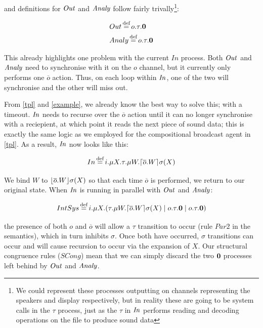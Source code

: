 \noindent and definitions for $\mathit{Out}$ and $\mathit{Analy}$ follow fairly
trivally\footnote{We could represent these processes outputting on
  channels representing the speakers and display respectively, but in
  reality these are going to be system calls in the $\tau$ process,
  just as the $\tau$ in $\mathit{In}$ performs reading and decoding operations
  on the file to produce sound data}:

\begin{equation}
\begin{aligned}
  & Out \operatorname{\stackrel{\textrm{def}}{=}} o.\tau.\textbf{0} \\
  & Analy \operatorname{\stackrel{\textrm{def}}{=}} o.\tau.\textbf{0}
\end{aligned}
\end{equation}

This already highlights one problem with the current $In$ process.
Both $\mathit{Out}$ and $\mathit{Analy}$ need to synchronise with it on the $o$ channel,
but it currently only performs one $\overline{o}$ action.  Thus, on
each loop within $\mathit{In}$, one of the two will synchronise and the other
will miss out.

From \ref{tpl} and \ref{example}, we already know the best way to
solve this; with a timeout.  $\mathit{In}$ needs to recurse over the
$\overline{o}$ action until it can no longer synchronise with a
reciepient, at which point it reads the next piece of sound data; this
is exactly the same logic as we employed for the compositional
broadcast agent in \ref{tpl}.  As a result, $\mathit{In}$ now looks like this:

\begin{equation}
  In \operatorname{\stackrel{\textrm{def}}{=}} i.\mu X.\tau.\mu W.\lceil{\overline{o}.W}\rceil {\sigma} ({X})
\end{equation}

\noindent We bind $W$ to $\lfloor{\overline{o}.W}\rfloor {\sigma} ({X})$ so that
each time $\overline{o}$ is performed, we return to our original state.
When $\mathit{In}$ is running in parallel with $\mathit{Out}$ and $\mathit{Analy}$:

\begin{equation}
  IntSys \operatorname{\stackrel{\textrm{def}}{=}} i.\mu X.(\tau.\mu W.\lceil{\overline{o}.W}\rceil {\sigma} ({X}) \;|\; o.\tau.\textbf{0} \;|\; o.\tau.\textbf{0})
\end{equation}

\noindent the presence of both $o$ and $\overline{o}$ will allow a
$\tau$ transition to occur (rule $Par2$ in the semantics), which in
turn inhibits $\sigma$.  Once both have occurred, $\sigma$ transitions
can occur and will cause recursion to occur via the expansion of $X$.
Our structural congruence rules ($SCong$) mean that we can simply
discard the two $\textbf{0}$ processes left behind by $\mathit{Out}$ and $\mathit{Analy}$.

